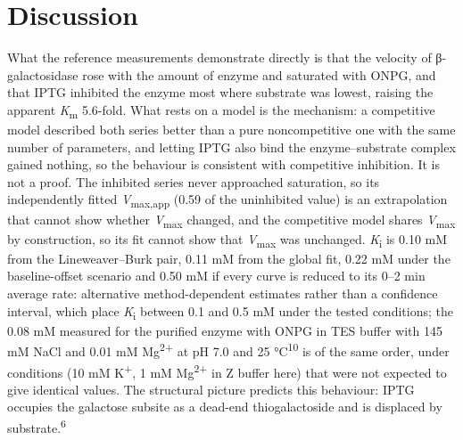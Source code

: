 \documentclass[9pt,twocolumn]{extarticle}
\newcommand{\cit}[1]{\textsuperscript{#1}}
\newcommand{\Km}{\textit{K}\textsubscript{m}}
\newcommand{\Vmax}{\textit{V}\textsubscript{max}}
\newcommand{\Vmaxapp}{\textit{V}\textsubscript{max,app}}
\newcommand{\Ki}{\textit{K}\textsubscript{i}}
\newcommand{\dash}{–}
\begin{document}
\section{Discussion}
What the reference measurements demonstrate directly is that the velocity of β-galactosidase rose with the amount of enzyme and saturated with ONPG, and that IPTG inhibited the enzyme most where substrate was lowest, raising the apparent \Km{} 5.6-fold. What rests on a model is the mechanism: a competitive model described both series better than a pure noncompetitive one with the same number of parameters, and letting IPTG also bind the enzyme\dash substrate complex gained nothing, so the behaviour is consistent with competitive inhibition. It is not a proof. The inhibited series never approached saturation, so its independently fitted \Vmaxapp{} (0.59 of the uninhibited value) is an extrapolation that cannot show whether \Vmax{} changed, and the competitive model shares \Vmax{} by construction, so its fit cannot show that \Vmax{} was unchanged. \Ki{} is 0.10 mM from the Lineweaver\dash Burk pair, 0.11 mM from the global fit, 0.22 mM under the baseline-offset scenario and 0.50 mM if every curve is reduced to its 0\dash 2 min average rate: alternative method-dependent estimates rather than a confidence interval, which place \Ki{} between 0.1 and 0.5 mM under the tested conditions; the 0.08 mM measured for the purified enzyme with ONPG in TES buffer with 145 mM NaCl and 0.01 mM Mg\textsuperscript{2+} at pH 7.0 and 25 °C\cit{10} is of the same order, under conditions (10 mM K\textsuperscript{+}, 1 mM Mg\textsuperscript{2+} in Z buffer here) that were not expected to give identical values. The structural picture predicts this behaviour: IPTG occupies the galactose subsite as a dead-end thiogalactoside and is displaced by substrate.\cit{6}
\end{document}
